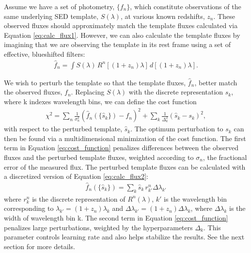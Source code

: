 Assume we have a set of photometry, $\{f_n\}$, which constitute observations of the same underlying SED template, $S(\lambda)$, at various known redshifts, $z_n$. 
These observed fluxes should approximately match the template fluxes calculated via Equation \ref{eq:calc_flux1}. 
However, we can also calculate the template fluxes by imagining that we are observing the template in its rest frame using a set of effective, blueshifted filters:
\begin{align}
    \hat{f}_n = \int S(\lambda) \, R^n[(1+z_n)\lambda] \, d[(1+z_n)\lambda]. \label{eq:calc_flux2}
\end{align}

We wish to perturb the template so that the template fluxes, $\hat{f}_n$, better match the observed fluxes, $f_n$. 
Replacing $S(\lambda)$ with the discrete representation $s_k$, where k indexes wavelength bins, we can define the cost function
\begin{align}
    \chi^2 =
    \sum_n \frac{1}{\sigma_n^2}(\hat{f}_n(\{\hat{s}_k\}) - f_n)^2 + 
    \sum_k \frac{1}{\Delta_k^2}(\hat{s}_k - s_k)^2, \label{eq:cost_function}
\end{align}
with respect to the perturbed template, $\hat{s}_k$. 
The optimum perturbation to $s_k$ can then be found via a multidimensional minimization of the cost function. 
The first term in Equation \ref{eq:cost_function} penalizes differences between the observed fluxes and the perturbed template fluxes, weighted according to $\sigma_n$, the fractional error of the measured flux. 
The perturbed template fluxes can be calculated with a discretized version of Equation \ref{eq:calc_flux2}:
\begin{align}
    \hat{f}_n(\{\hat{s}_k\}) = \sum_k \hat{s}_k \, r_{k'}^n \Delta\lambda_{k'}
\end{align}
where $r_k^n$ is the discrete representation of $R^n(\lambda)$, $k'$ is the wavelength bin corresponding to $\lambda_{k'} = (1+z_n) \lambda_k$ and $\Delta\lambda_{k'} = (1+z_n)\Delta\lambda_k$, where $\Delta\lambda_k$ is the width of wavelength bin k. 
The second term in Equation \ref{eq:cost_function} penalizes large perturbations, weighted by the hyperparameters $\Delta_k$. 
This parameter controls learning rate and also helps stabilize the results. 
See the next section for more details. 

